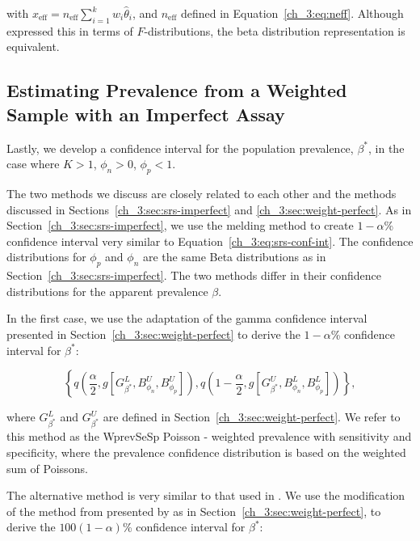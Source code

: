 with \( x_{\text{eff}} = n_{\text{eff}} \sum_{i=1}^k w_i \hat{\theta}_i \), and \( n_{\text{eff}} \) defined in Equation~\ref{ch_3:eq:neff}.
Although \citet{Dean:2015} expressed this in terms of \(F\)-distributions, the beta distribution representation is equivalent.

\subsection{Estimating Prevalence from a Weighted Sample with an Imperfect Assay}
\label{ch_3:sec:weight-imperfect}

Lastly, we develop a confidence interval for the population prevalence, \( \beta^* \), in the case where \( K > 1 \), \( \phi_n > 0 \), \( \phi_p < 1 \).

The two methods we discuss are closely related to each other and the methods discussed in Sections~\ref{ch_3:sec:srs-imperfect} and \ref{ch_3:sec:weight-perfect}.
As in Section~\ref{ch_3:sec:srs-imperfect}, we use the melding method \citep{FayP:2015} to create \( 1 - \alpha \)\% confidence interval very similar to Equation~\ref{ch_3:eq:srs-conf-int}.
The confidence distributions for \( \phi_p \) and \( \phi_n \) are the same Beta distributions as in Section~\ref{ch_3:sec:srs-imperfect}.
The two methods differ in their confidence distributions for the apparent prevalence \( \beta \).

In the first case, we use the adaptation of the gamma confidence interval \citep{FayF:1997} presented in Section~\ref{ch_3:sec:weight-perfect} to derive the \( 1 - \alpha \)\% confidence interval for \( \beta^* \):

\begin{equation}
    \left\{ q \left( \frac{\alpha}{2}, %
    g \left[ G^L_{\beta^*}, B^U_{\phi_n}, B^U_{\phi_p} \right]
    \right), q \left( 1 - \frac{\alpha}{2}, %
       g \left[G^U_{\beta^*}, B^L_{\phi_n}, B^L_{\phi_p} \right] \right)
       \right\},
\end{equation}

where \( G_{\beta^*}^L \) and \( G_{\beta^*}^U \) are defined in Section~\ref{ch_3:sec:weight-perfect}.
We refer to this method as the WprevSeSp Poisson - weighted prevalence with sensitivity and specificity, where the prevalence confidence distribution is based on the weighted sum of Poissons.

The alternative method is very similar to that used in \citep{Kali:2021}.
We use the modification of the method from \citep{Korn:1998} presented by \citet{Dean:2015} as in Section~\ref{ch_3:sec:weight-perfect}, to derive the \( 100(1 - \alpha) \)\% confidence interval for \( \beta^* \):

